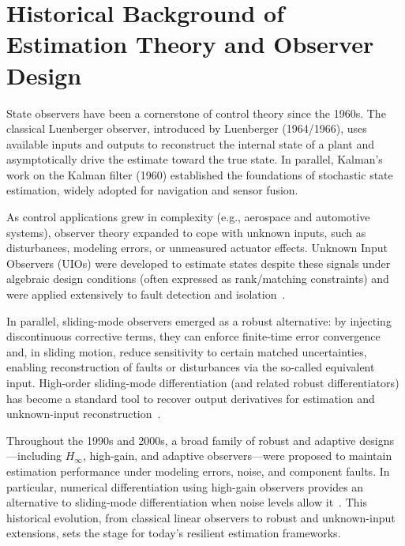 \section{Historical Background of Estimation Theory and Observer Design}
State observers have been a cornerstone of control theory since the 1960s. The classical Luenberger observer, introduced by Luenberger (1964/1966), uses available inputs and outputs to reconstruct the internal state of a plant and asymptotically drive the estimate toward the true state. In parallel, Kalman's work on the Kalman filter (1960) established the foundations of stochastic state estimation, widely adopted for navigation and sensor fusion.

As control applications grew in complexity (e.g., aerospace and automotive systems), observer theory expanded to cope with unknown inputs, such as disturbances, modeling errors, or unmeasured actuator effects. Unknown Input Observers (UIOs) were developed to estimate states despite these signals under algebraic design conditions (often expressed as rank/matching constraints) and were applied extensively to fault detection and isolation~\cite{darouach1994full,trinh2011functional}.

In parallel, sliding-mode observers emerged as a robust alternative: by injecting discontinuous corrective terms, they can enforce finite-time error convergence and, in sliding motion, reduce sensitivity to certain matched uncertainties, enabling reconstruction of faults or disturbances via the so-called equivalent input. High-order sliding-mode differentiation (and related robust differentiators) has become a standard tool to recover output derivatives for estimation and unknown-input reconstruction~\cite{Levant,sliding_diff_zhu}.

Throughout the 1990s and 2000s, a broad family of robust and adaptive designs---including $H_\infty$, high-gain, and adaptive observers---were proposed to maintain estimation performance under modeling errors, noise, and component faults. In particular, numerical differentiation using high-gain observers provides an alternative to sliding-mode differentiation when noise levels allow it~\cite{Khalil}. This historical evolution, from classical linear observers to robust and unknown-input extensions, sets the stage for today's resilient estimation frameworks.
